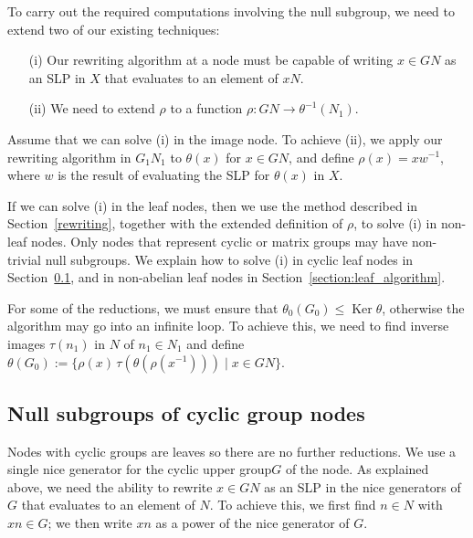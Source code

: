 \documentclass[12pt,twoside,reqno,psamsfonts]{amsproc}
\newcommand{\uppergp}{{upper group}\xspace}
\newcommand{\nullsubgp}{{null subgroup}\xspace}
\newcommand{\Nullsubgp}{{Null subgroup}\xspace}
\numberwithin{equation}{section}
\numberwithin{figure}{section}
\newcounter{algorithm}
\theoremstyle{plain}
\theoremstyle{definition}
\theoremstyle{remark}
\DeclareMathOperator{\Ker}{Ker}
\begin{document}
To carry out the required computations involving the \nullsubgp, we need to
extend two of our existing techniques:
\begin{enumerate}
\item[(i)] Our rewriting algorithm at a node must be capable of writing 
$x \in GN$ as an SLP in $X$ that evaluates to an element of $xN$. 
\item[(ii)]
We need to extend $\rho$ to a function $\rho :GN \to \theta^{-1}(N_1)$.
\end{enumerate}

Assume that we can solve (i) in the image node.
To achieve (ii), we apply our rewriting algorithm in 
$G_1N_1$ to $\theta(x)$ for $x \in GN$,
and define $\rho(x) = xw^{-1}$, where $w$ is
the result of evaluating the SLP for $\theta(x)$ 
in $X$. 

If we can solve (i) in the leaf nodes, then we use the method
described in Section~\ref{rewriting}, together with the extended
definition of $\rho$, to solve (i) in non-leaf nodes.
Only nodes that represent cyclic or matrix groups may
have non-trivial {\nullsubgp}s.
We explain how to solve (i) in cyclic leaf nodes in
Section~\ref{subsec:cyclicnodes}, and in non-abelian leaf nodes
in Section~\ref{section:leaf_algorithm}.

For some of the reductions, we must ensure that
$\theta_0(G_0) \leqslant \Ker \theta$, otherwise the algorithm may go into
an infinite loop.
To achieve this, we need to find inverse images $\tau(n_1)$ in $N$
of $n_1 \in N_1$ and define
$\theta(G_0) := \{ \rho(x)\, \tau(\theta(\rho(x^{-1}))) \mid x \in GN \}$.


\subsection{{\Nullsubgp}s of cyclic group nodes}\label{subsec:cyclicnodes}
Nodes with cyclic groups are leaves so there are no further reductions.
We use a single nice generator for the cyclic \uppergp $G$ of
the node.
As explained above, we need the ability to rewrite $x \in GN$ as an SLP
in the nice generators of $G$ that evaluates to an element of $N$.
To achieve this, we first find $n \in N$
with $xn \in G$; we then write $xn$ as a power of the nice generator of $G$.
\end{document}
